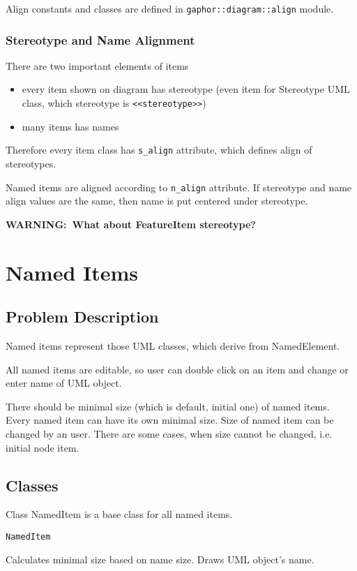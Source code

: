 \documentclass[draft]{book}
\newcommand{\rmodule}[1]{\texttt{#1}}
\newcommand{\rattr}[1]{\texttt{#1}}
\newcommand{\rstereotype}[1]{\texttt{<<#1>>}}
\newcommand{\warning}[1]{\textbf{WARNING:~#1}}
\newlength{\dscwidth}
\newcommand{\dlabel}[1]{\par\noindent\makebox[6em][r]{\textbf{#1:}}\hspace{1em}}
\newenvironment{entitydesc}{%
\dlabel{Description}%
\begin{minipage}[t]{\dscwidth}
}{%
\end{minipage}
}
\newenvironment{class}[1]{%
\dlabel{\underline{Class}}\texttt{#1}\nopagebreak[4]
}{%
\par\vspace{2em}
}
\begin{document}
Align constants and classes are defined in \rmodule{gaphor::diagram::align} module.

\subsection{Stereotype and Name Alignment}

There are two important elements of items
\begin{itemize}
\item every item shown on diagram has stereotype (even item for Stereotype
    UML class, which stereotype is \rstereotype{stereotype})
\item many items has names
\end{itemize}

Therefore every item class has \rattr{s\_align} attribute, which defines
align of stereotypes.

Named items are aligned according to \rattr{n\_align} attribute. If
stereotype and name align values are the same, then name is put
centered under stereotype.

\warning{What about FeatureItem stereotype?}

\chapter{Named Items}
\section{Problem Description}
Named items represent those UML classes, which derive from NamedElement.

All named items are editable, so user can double click on an item and
change or enter name of UML object.

There should be minimal size (which is default, initial one) of named
items. Every named item can have its own minimal size. Size of named item
can be changed by an user. There are some cases, when size cannot be
changed, i.e. initial node item.


\section{Classes}
Class NamedItem is a base class for all named items.

\begin{class}{NamedItem}
\begin{entitydesc}
Calculates minimal size based on name size. Draws UML object's name.
\end{entitydesc}
\end{class}
\end{document}
